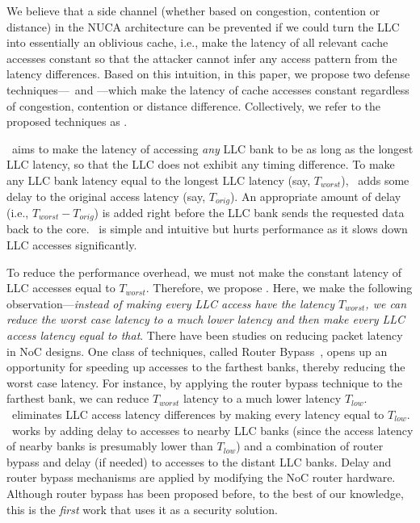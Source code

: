We believe that a side channel (whether based on congestion, contention or distance) in the NUCA architecture can be prevented if we could turn the LLC into essentially an oblivious cache, i.e., make the latency of all relevant cache accesses constant so that the attacker cannot infer any access pattern from the latency differences.
Based on this intuition, in this paper, we propose two defense techniques---\jscheme\ and \bscheme---which make the latency of cache accesses constant regardless of congestion, contention or distance difference.
Collectively, we refer to the proposed techniques as \scheme.

\jscheme\ aims to make the latency of accessing {\em any} LLC bank to be as long as the longest LLC latency, so that the LLC does not exhibit any timing difference.
To make any LLC bank latency equal to the longest LLC latency (say, $T_{worst}$), \jscheme\ adds some delay to the original access latency (say, $T_{orig}$).
An appropriate amount of delay (i.e., $T_{worst}-T_{orig}$) is added right before the LLC bank sends the requested data back to the core.
\jscheme\ is simple and intuitive but hurts performance as it slows down LLC accesses significantly.

To reduce the performance overhead, we must not make the constant latency of LLC accesses equal to $T_{worst}$.
Therefore, we propose \bscheme.
Here, we make the following observation---{\em instead of making every LLC access have the latency $T_{worst}$, we can reduce the worst case latency to a much lower latency and then make every LLC access latency equal to that}.
There have been studies on reducing packet latency in NoC designs.
One class of techniques, called Router Bypass~\cite{krishna2013breaking,chen2013smart,krishna2013single,kwon2017opensmart,yang2017task,perez2019smart++,zong2016doart,ma2021latency}, opens up an opportunity for speeding up accesses to the farthest banks, thereby reducing the worst case latency.
For instance, by applying the router bypass technique to the farthest bank, we can reduce $T_{worst}$ latency to a much lower latency $T_{low}$.
\bscheme\ eliminates LLC access latency differences by making every latency equal to $T_{low}$.
\bscheme\ works by adding delay to accesses to nearby LLC banks (since the access latency of nearby banks is presumably lower than $T_{low}$) and a combination of router bypass and delay (if needed) to accesses to the distant LLC banks.
Delay and router bypass mechanisms are applied by modifying the NoC router hardware.
Although router bypass has been proposed before, to the best of our knowledge, this is the {\em first} work that uses it as a security solution.

